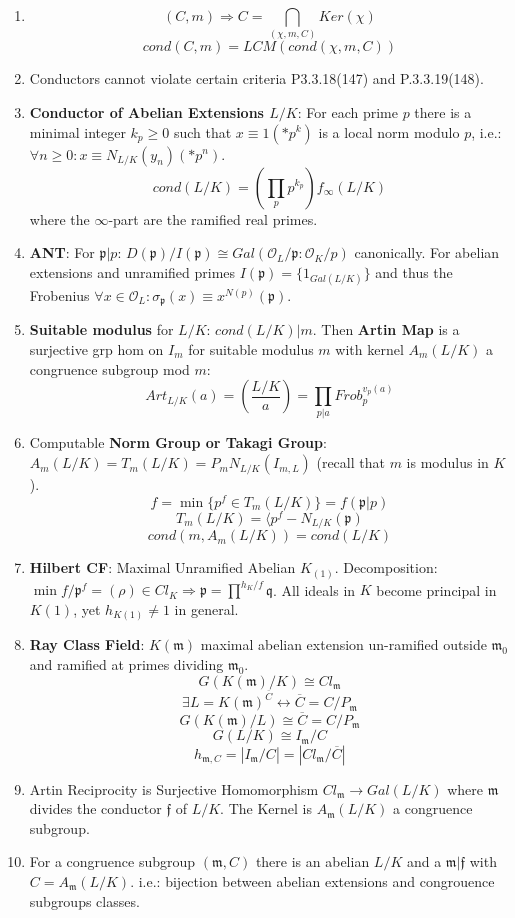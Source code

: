 \documentclass{article}
\newcommand{\OO}{\mathcal{O}}
\newcommand{\pp}{\mathfrak{p}}
\newcommand{\qq}{\mathfrak{q}}
\newcommand{\ff}{\mathfrak{f}}
\newcommand{\mm}{\mathfrak{m}}
\newcommand{\ra}{\rightarrow}
\newcommand{\Ra}{\Rightarrow}
\newcommand{\lra}{\leftrightarrow}
\begin{document}
\begin{multicols}{2}
\begin{enumerate}
\item
\[(C,m) \Ra C = \bigcap_{(\chi,m,C)}Ker(\chi)\]
\[cond(C,m) = LCM(cond(\chi,m,C))\]

\item Conductors cannot violate certain criteria P3.3.18(147) and P.3.3.19(148).

\item \textbf{Conductor of Abelian Extensions $L/K$}: For each prime $p$ there is a minimal integer $k_p \geq 0$ such that $x \equiv 1 (*p^k)$ is a local norm modulo $p$, i.e.: $\forall n \geq 0: x \equiv N_{L/K}(y_n) (*p^n)$. 
\[cond(L/K) = \left(\prod_p p^{k_p}\right) f_\infty(L/K)\]
where the $\infty$-part are the ramified real primes. 

\item \textbf{ANT}: For $\pp|p$: $D(\pp)/I(\pp) \cong Gal(\OO_L/\pp: \OO_K/p)$ canonically. For abelian extensions and unramified primes $I(\pp) = \{1_{Gal(L/K)}\}$ and thus the Frobenius $\forall x \in \OO_L: \sigma_\pp(x) \equiv x^{N(p)} (\pp)$.

\item \textbf{Suitable modulus} for $L/K$: $cond(L/K)|m$. Then \textbf{Artin Map} is a surjective grp hom on $I_m$ for suitable modulus $m$ with kernel $A_m(L/K)$ a congruence subgroup mod $m$: 
\[Art_{L/K}(a) = (\frac{L/K}{a}) = \prod_{p|a} Frob_p^{v_p(a)}\]

\item Computable \textbf{Norm Group or Takagi Group}: $A_m(L/K) = T_m(L/K) = P_m N_{L/K}(I_{m,L})$ (recall that $m$ is modulus in $K$). 
\[f = \min\{p^f \in T_m(L/K)\} = f(\pp|p)\]
\[T_m(L/K) = \langle p^f - N_{L/K}(\pp)\]
\[cond(m, A_m(L/K)) = cond(L/K)\]



\item \textbf{Hilbert CF}: Maximal Unramified Abelian $K_(1)$. Decomposition: $\min f/\pp^f = (\rho) \in Cl_K \Ra \pp = \prod^{h_K/f} \qq$. All ideals in $K$ become principal in $K(1)$, yet $h_{K(1)} \neq 1$ in general. 


\item \textbf{Ray Class Field}: $K(\mm)$ maximal abelian extension un-ramified outside $\mm_0$ and ramified at primes dividing $\mm_0$. 
\[G(K(\mm)/K) \cong Cl_\mm\]
\[\exists L = K(\mm)^{\overline{C}} \lra \overline{C} = C/P_\mm\]  
\[G(K(\mm)/L) \cong \overline{C} = C/P_\mm\]
\[G(L/K) \cong I_\mm/C\]
\[h_{\mm,C} = |I_\mm/C| = |Cl_\mm/\overline{C}|\]

\item Artin Reciprocity is Surjective Homomorphism $Cl_\mm \ra Gal(L/K)$ where $\mm$ divides the conductor $\ff$ of $L/K$. The Kernel is $A_\mm(L/K)$ a congruence subgroup. 

\item For a congruence subgroup $(\mm,C)$ there is an abelian $L/K$ and a $\mm|\ff$ with $C = A_\mm(L/K)$. i.e.: bijection between abelian extensions and congrouence subgroups classes. 
 
 
 

\end{enumerate}
\end{multicols}
\end{document}
